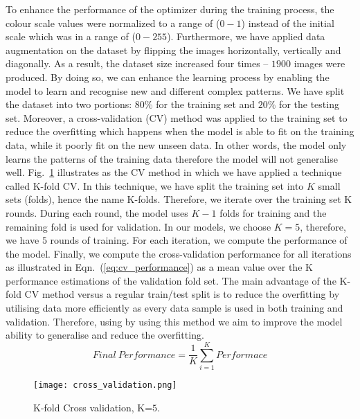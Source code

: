 To enhance the performance of the optimizer during the training process, the colour scale values were normalized to a range of (\(0-1\)) instead of the initial scale which was in a range of (\(0 - 255\)).	
Furthermore, we have applied data augmentation on the dataset by flipping the images horizontally, vertically and diagonally. 
As a result, the dataset size increased four times -- \(1900\)  images were produced.
By doing so, we can enhance the learning process by enabling the model to learn and recognise new and different complex patterns.
We have split the dataset into two portions:  \(80\%\) for the training set and \(20\%\) for the testing set.
Moreover, a cross-validation (CV) method was applied to the training set to reduce the overfitting which happens when the model is able to fit on the training data, while it poorly fit on the new unseen data.
In other words, the model only learns the patterns of the training data therefore the model will not generalise well. 
Fig.~\ref{fig:Cross_validation} illustrates as the CV method in which  we have applied a technique called K-fold CV.
In this technique, we have split the training set into \(K\) small sets (folds), hence the name K-folds. 
Therefore, we iterate over the training set K rounds.
During each round, the model uses  \(K-1\) folds for training and the remaining fold is used for validation. 
In our models, we choose \(K=5\), therefore, we have \(5\) rounds of training. 
For each iteration, we compute the performance of the model.
Finally, we compute the cross-validation performance for all iterations as illustrated in Eqn.~(\ref{eq:cv_performance}) as a mean value over the K performance estimations of the validation fold set.
The main advantage of the K-fold CV method versus a regular train/test split is to reduce the overfitting by utilising data more efficiently as every data sample is used in both training and validation. 
Therefore, using by using this method we aim to improve the model ability to generalise and reduce the overfitting.
\begin{equation}
Final \ Performance = \frac{1}{K}\sum_{i=1}^{K}Performace
\label{eq:cv_performance}
\end{equation}
\begin{figure}
	\centering
	\texttt{[image: cross\_validation.png]}
	\caption{K-fold Cross validation, K=\(5\).}
	\label{fig:Cross_validation}
\end{figure}
